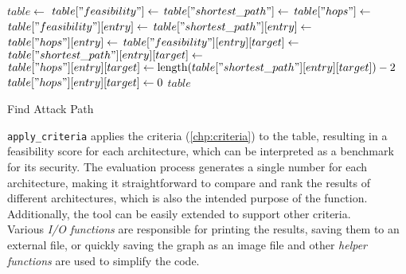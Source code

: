 \begin{algorithm}[h]
    \label{alg:findattackpath}
    \begin{algorithmic}[1]
        \State $table \gets$ 
        \State $table["feasibility"] \gets$ 
        \State $table["shortest\_path"] \gets$ 
        \State $table["hops"] \gets$ 
            \State $table["feasibility"][entry] \gets$ 
            \State $table["shortest\_path"][entry] \gets$ 
            \State $table["hops"][entry] \gets$ 
                \State $table["feasibility"][entry][target] \gets$ 
                \State $table["shortest\_path"][entry][target] \gets$ 
                    \State $table["hops"][entry][target] \gets \text{length}(table["shortest\_path"][entry][target]) - 2$
                \Else
                    \State $table["hops"][entry][target] \gets 0$
                \EndIf
            \EndFor
        \EndFor
        \State \Return $table$
    \EndProcedure
    \caption{Find Attack Path}
    \end{algorithmic}
\end{algorithm}
    
\texttt{apply\_criteria} applies the criteria (\ref{chp:criteria}) to the table, 
resulting in a feasibility score for each architecture, 
which can be interpreted as a benchmark for its security. 
The evaluation process generates a single number for each architecture, 
making it straightforward to compare and rank the results of different architectures, 
which is also the intended purpose of the function. 
Additionally, the tool can be easily extended to support other criteria.\\

Various \textit{I/O functions} are responsible for printing the results, saving them to an external file, or quickly saving the graph as an image file
and other \textit{helper functions} are used to simplify the code.

\newpage

